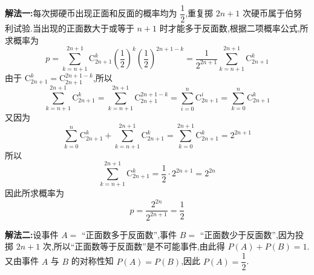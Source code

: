 \begin{solution}
    
    \textbf{解法一:}每次掷硬币出现正面和反面的概率均为 $\dfrac{1}{2}$,重复掷 $2n+1$ 次硬币属于伯努利试验.当出现的正面数大于或等于 $n+1$ 时才能多于反面数,根据二项概率公式,所求概率为
    $$
    p = \sum_{k=n+1}^{2n+1} \mathrm{C}_{2n+1}^k \left( \dfrac{1}{2} \right)^k \left( \dfrac{1}{2} \right)^{2n+1-k} = \dfrac{1}{2^{2n+1}} \sum_{k=n+1}^{2n+1} \mathrm{C}_{2n+1}^k
    $$
    由于 $\mathrm{C}_{2n+1}^{k} = \mathrm{C}_{2n+1}^{2n+1-k}$,所以
    $$
    \sum_{k=n+1}^{2n+1} \mathrm{C}_{2n+1}^k = \sum_{k=n+1}^{2n+1} \mathrm{C}_{2n+1}^{2n+1-k} = \sum_{i=0}^{n} \mathrm{C}_{2n+1}^i = \sum_{k=0}^{n} \mathrm{C}_{2n+1}^k
    $$
    又因为
    $$
    \sum_{k=0}^{n} \mathrm{C}_{2n+1}^k + \sum_{k=n+1}^{2n+1} \mathrm{C}_{2n+1}^k = \sum_{k=0}^{2n+1} \mathrm{C}_{2n+1}^k = 2^{2n+1}
    $$
    所以
    $$
    \sum_{k=n+1}^{2n+1} \mathrm{C}_{2n+1}^k = \dfrac{1}{2} \cdot 2^{2n+1} = 2^{2n}
    $$
    因此所求概率为
    $$
    p = \dfrac{2^{2n}}{2^{2n+1}} = \dfrac{1}{2}
    $$

    \textbf{解法二:}设事件 $A=$ ``正面数多于反面数'',事件 $B=$ ``正面数少于反面数'',因为投掷 $2n+1$ 次,所以``正面数等于反面数''是不可能事件,由此得 $P(A) + P(B) = 1$.又由事件 $A$ 与 $B$ 的对称性知 $P(A) = P(B)$,因此 $P(A)=\dfrac{1}{2}$.
\end{solution}